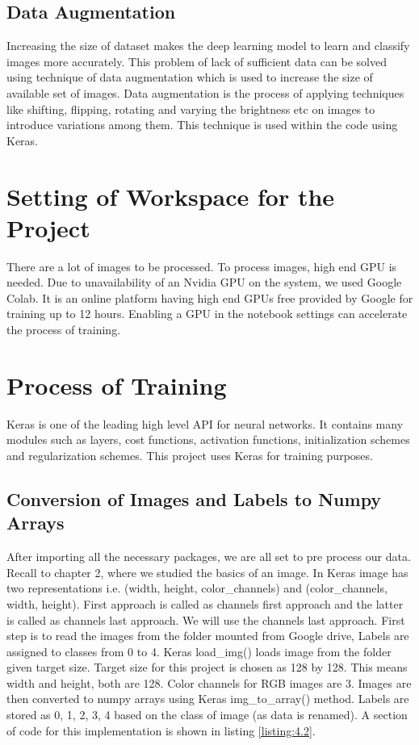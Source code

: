 \subsection{Data Augmentation}
Increasing the size of dataset makes the deep learning model to learn and classify images more accurately. This problem of lack of sufficient data can be solved using technique of data augmentation which is used to increase the size of available set of images.
Data augmentation is the process of applying techniques like shifting, flipping, rotating and varying the brightness etc on images to introduce variations among them.
This technique is used within the code using Keras.
\section{Setting of Workspace for the Project}
There are a lot of images to be processed. To process images, high end GPU is
needed. Due to unavailability of an Nvidia GPU on the system, we used Google Colab.
It is an online platform having high end GPUs free provided by Google for training
up to 12 hours. Enabling a GPU in the notebook settings can accelerate the process of
training.
\section{Process of Training}
Keras is one of the leading high level API for neural networks. It contains
many modules such as layers, cost functions, activation functions, initialization
schemes and regularization schemes. This project uses Keras for training purposes.
\subsection{Conversion of Images and Labels to Numpy Arrays}
After importing all the necessary packages, we are all set to pre process our data.
Recall to chapter 2, where we studied the basics of an image. In Keras image has two
representations i.e. (width, height, color\_channels) and (color\_channels, width, height).
First approach is called as channels first approach and the latter is called as
channels last approach. We will use the channels last approach.
First step is to read the images from the folder mounted from Google drive,
Labels are assigned to classes from 0 to 4. Keras load\_img() loads image from the folder given
target size. Target size for this project is chosen as 128 by 128. This means width and height,
both are 128. Color channels for RGB images are 3. Images are then converted to numpy arrays using
Keras img\_to\_array() method. Labels are stored as 0, 1, 2, 3, 4 based on the class of image (as data is renamed).
A section of code for this implementation is shown in listing \ref{listing:4.2}.

